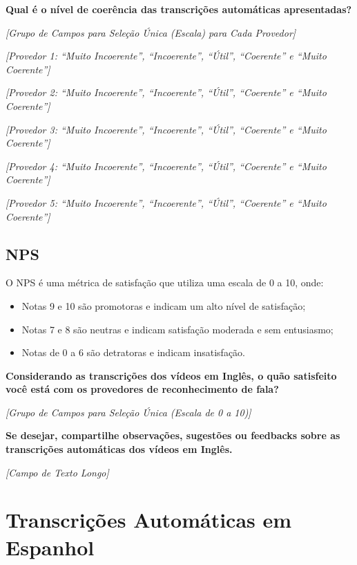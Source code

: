 \noindent
\textbf{Qual é o nível de coerência das transcrições automáticas apresentadas?}

\noindent
\textit{[Grupo de Campos para Seleção Única (Escala) para Cada Provedor]}

\noindent
\textit{[Provedor 1: ``Muito Incoerente'', ``Incoerente'', ``Útil'', ``Coerente'' e ``Muito Coerente'']}

\noindent
\textit{[Provedor 2: ``Muito Incoerente'', ``Incoerente'', ``Útil'', ``Coerente'' e ``Muito Coerente'']}

\noindent
\textit{[Provedor 3: ``Muito Incoerente'', ``Incoerente'', ``Útil'', ``Coerente'' e ``Muito Coerente'']}

\noindent
\textit{[Provedor 4: ``Muito Incoerente'', ``Incoerente'', ``Útil'', ``Coerente'' e ``Muito Coerente'']}

\noindent
\textit{[Provedor 5: ``Muito Incoerente'', ``Incoerente'', ``Útil'', ``Coerente'' e ``Muito Coerente'']}

\subsection{NPS}

\noindent
O NPS é uma métrica de satisfação que utiliza uma escala de 0 a 10, onde: 

\begin{itemize}
    \item Notas 9 e 10 são promotoras e indicam um alto nível de satisfação; 
    \item Notas 7 e 8 são neutras e indicam satisfação moderada e sem entusiasmo; 
    \item Notas de 0 a 6 são detratoras e indicam insatisfação.
\end{itemize}

\noindent
\textbf{Considerando as transcrições dos vídeos em Inglês, o quão satisfeito você está com os provedores de reconhecimento de fala?}

\noindent
\textit{[Grupo de Campos para Seleção Única (Escala de 0 a 10)]}

\noindent
\textbf{Se desejar, compartilhe observações, sugestões ou feedbacks sobre as transcrições automáticas dos vídeos em Inglês.}

\noindent
\textit{[Campo de Texto Longo]}

\section{Transcrições Automáticas em Espanhol}

